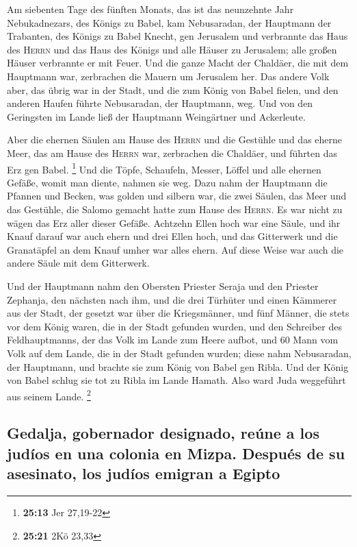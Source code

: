  Am siebenten Tage des fünften Monats, das ist das
neunzehnte Jahr Nebukadnezars, des Königs zu Babel, kam Nebusaradan, der
Hauptmann der Trabanten, des Königs zu Babel Knecht, gen Jerusalem
 und verbrannte das Haus des \textsc{Herrn} und das Haus
des Königs und alle Häuser zu Jerusalem; alle großen Häuser verbrannte
er mit Feuer.  Und die ganze Macht der Chaldäer, die mit
dem Hauptmann war, zerbrachen die Mauern um Jerusalem her.
 Das andere Volk aber, das übrig war in der Stadt, und
die zum König von Babel fielen, und den anderen Haufen führte
Nebusaradan, der Hauptmann, weg.  Und von den Geringsten
im Lande ließ der Hauptmann Weingärtner und Ackerleute.

 Aber die ehernen Säulen am Hause des \textsc{Herrn} und
die Gestühle und das eherne Meer, das am Hause des \textsc{Herrn} war,
zerbrachen die Chaldäer, und führten das Erz gen Babel. \footnote{\textbf{25:13}
  Jer 27,19-22}  Und die Töpfe, Schaufeln, Messer, Löffel
und alle ehernen Gefäße, womit man diente, nahmen sie weg.
 Dazu nahm der Hauptmann die Pfannen und Becken, was
golden und silbern war,  die zwei Säulen, das Meer und
das Gestühle, die Salomo gemacht hatte zum Hause des \textsc{Herrn}. Es
war nicht zu wägen das Erz aller dieser Gefäße.  Achtzehn
Ellen hoch war eine Säule, und ihr Knauf darauf war auch ehern und drei
Ellen hoch, und das Gitterwerk und die Granatäpfel an dem Knauf umher
war alles ehern. Auf diese Weise war auch die andere Säule mit dem
Gitterwerk.

 Und der Hauptmann nahm den Obersten Priester Seraja und
den Priester Zephanja, den nächsten nach ihm, und die drei Türhüter
 und einen Kämmerer aus der Stadt, der gesetzt war über
die Kriegsmänner, und fünf Männer, die stets vor dem König waren, die in
der Stadt gefunden wurden, und den Schreiber des Feldhauptmanns, der das
Volk im Lande zum Heere aufbot, und 60 Mann vom Volk auf dem Lande, die
in der Stadt gefunden wurden;  diese nahm Nebusaradan,
der Hauptmann, und brachte sie zum König von Babel gen Ribla.
 Und der König von Babel schlug sie tot zu Ribla im Lande
Hamath. Also ward Juda weggeführt aus seinem Lande. \footnote{\textbf{25:21}
  2Kö 23,33}

\hypertarget{gedalja-gobernador-designado-reuxfane-a-los-juduxedos-en-una-colonia-en-mizpa.-despuuxe9s-de-su-asesinato-los-juduxedos-emigran-a-egipto}{%
\subsection{Gedalja, gobernador designado, reúne a los judíos en una
colonia en Mizpa. Después de su asesinato, los judíos emigran a
Egipto}\label{gedalja-gobernador-designado-reuxfane-a-los-juduxedos-en-una-colonia-en-mizpa.-despuuxe9s-de-su-asesinato-los-juduxedos-emigran-a-egipto}}

